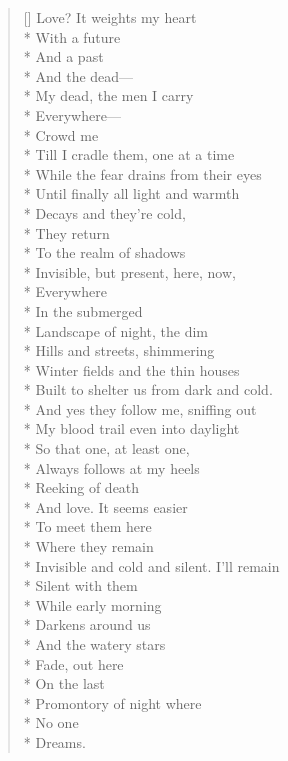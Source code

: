 \begin{verse}[\versewidth]
Love? It weights my heart\\*
With a future \\*
And a past\\*
And the dead---\\*
My dead, the men I carry\\*
Everywhere---\\*
Crowd me\\*
Till I cradle them, one at a time\\*
While the fear drains from their eyes\\*
Until finally all light and warmth\\*
Decays and they're cold,\\*
They return\\*
To the realm of shadows\\*
Invisible, but present, here, now,\\*
Everywhere\\*
In the submerged \\*
Landscape of night, the dim \\*
Hills and streets, shimmering\\*
Winter fields and the thin houses\\*
Built to shelter us from dark and cold.\\*
And yes they follow me, sniffing out\\*
My blood trail even into daylight\\*
So that one, at least one,\\*
Always follows at my heels\\*
Reeking of death\\*
And love.   It seems easier\\*
To meet them here\\*
Where they remain\\*
Invisible and cold and silent.   I'll remain\\*
Silent with them\\*
While early morning\\*
Darkens around us\\*
And the watery stars\\*
Fade, out here\\*
On the last \\*
Promontory of night          where \\*
No one \\*
Dreams.
\end{verse}

